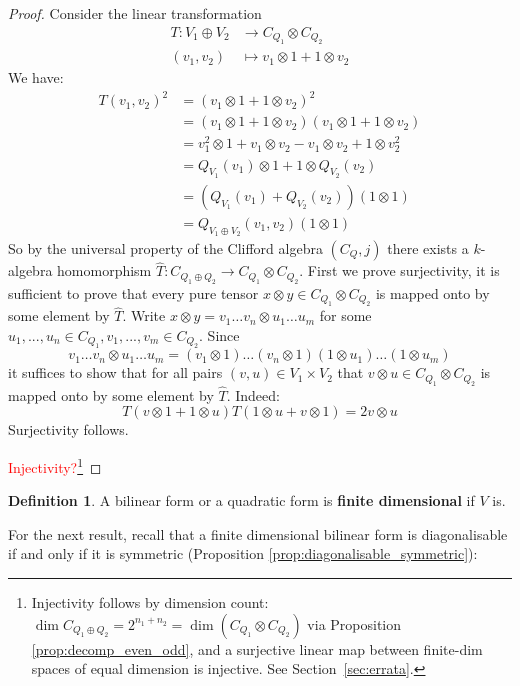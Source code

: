 \documentclass[12pt]{article}
\theoremstyle{plain}
\theoremstyle{definition}
\newtheorem{defn}[thm]{Definition} %
\newcommand{\lto}{\longrightarrow}
\begin{document}
\begin{proof}
Consider the linear transformation
\begin{align*}
T: V_1 \oplus V_2 &\lto C_{Q_1} \otimes C_{Q_2}\\
(v_1,v_2) &\longmapsto v_1 \otimes 1 + 1 \otimes v_2
\end{align*}
We have:
\begin{align*}
T(v_1,v_2)^2 &= (v_1 \otimes 1 + 1 \otimes v_2)^2\\
&= (v_1 \otimes 1 + 1 \otimes v_2)(v_1 \otimes 1 + 1 \otimes v_2)\\
&= v_1^2 \otimes 1 + v_1 \otimes v_2 - v_1 \otimes v_2 + 1 \otimes v_2^2\\
&= Q_{V_1}(v_1) \otimes 1 + 1 \otimes Q_{V_2}(v_2)\\
&= (Q_{V_1}(v_1) + Q_{V_2}(v_2))(1 \otimes 1)\\
&= Q_{V_1 \oplus V_2}(v_1,v_2)(1 \otimes 1)
\end{align*}
So by the universal property of the Clifford algebra $(C_Q,j)$ there exists a $k$-algebra homomorphism $\hat{T}: C_{Q_1 \oplus Q_2} \lto C_{Q_1} \otimes C_{Q_2}$. First we prove surjectivity, it is sufficient to prove that every pure tensor $x \otimes y \in C_{Q_1} \otimes C_{Q_2}$ is mapped onto by some element by $\hat{T}$. Write $x \otimes y = v_1\hdots v_n \otimes u_1 \hdots u_m$ for some $u_1,...,u_n \in C_{Q_1}, v_1,...,v_m \in C_{Q_2}$. Since
\begin{equation}
v_1\hdots v_n \otimes u_1 \hdots u_m = (v_1 \otimes 1)\hdots(v_n \otimes 1)(1 \otimes u_1)\hdots (1 \otimes u_m)
\end{equation}
it suffices to show that for all pairs $(v,u) \in V_1 \times V_2$ that $v \otimes u \in C_{Q_1} \otimes C_{Q_2}$ is mapped onto by some element by $\hat{T}$. Indeed:
\begin{equation}
T(v \otimes 1 + 1 \otimes u)T(1 \otimes u + v \otimes 1) = 2v\otimes u
\end{equation}
Surjectivity follows.

\textcolor{red}{Injectivity?}\footnote{Injectivity follows by dimension count: $\dim C_{Q_1\oplus Q_2}=2^{n_1+n_2}=\dim(C_{Q_1}\otimes C_{Q_2})$ via Proposition \ref{prop:decomp_even_odd}, and a surjective linear map between finite-dim spaces of equal dimension is injective. See Section~\ref{sec:errata}.}
\end{proof}
\begin{defn}
A bilinear form or a quadratic form is \textbf{finite dimensional} if $V$ is.
\end{defn}
For the next result, recall that a finite dimensional bilinear form is diagonalisable if and only if it is symmetric (Proposition \ref{prop:diagonalisable_symmetric}):
\end{document}
